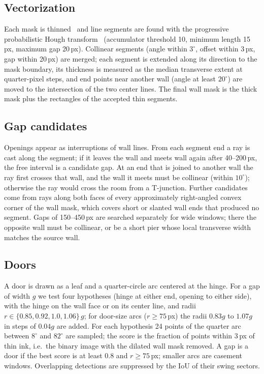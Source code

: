 \documentclass[conference]{IEEEtran}
\begin{document}
\subsection{Vectorization}

Each mask is thinned~\cite{zhang1984thinning} and line segments are found
with the progressive probabilistic Hough transform~\cite{matas2000pphough}
(accumulator threshold 10, minimum length 15\,px, maximum gap 20\,px).
Collinear segments (angle within $3^\circ$, offset within 3\,px, gap within
20\,px) are merged; each segment is extended along its direction to the mask
boundary, its thickness is measured as the median transverse extent at
quarter-pixel steps, and end points near another wall (angle at least
$20^\circ$) are moved to the intersection of the two center lines. The final
wall mask is the thick mask plus the rectangles of the accepted thin
segments.

\subsection{Gap candidates}

Openings appear as interruptions of wall lines. From each segment end a ray
is cast along the segment; if it leaves the wall and meets wall again after
40--200\,px, the free interval is a candidate gap. At an end that is joined
to another wall the ray first crosses that wall, and the wall it meets must
be collinear (within $10^\circ$); otherwise the ray would cross the room
from a T-junction. Further candidates come from rays along both faces of
every approximately right-angled convex corner of the wall mask, which
covers short or slanted wall ends that produced no segment. Gaps of
150--450\,px are searched separately for wide windows; there the opposite
wall must be collinear, or be a short pier whose local transverse width
matches the source wall.

\subsection{Doors}

A door is drawn as a leaf and a quarter-circle arc centered at the hinge.
For a gap of width $g$ we test four hypotheses (hinge at either end, opening
to either side), with the hinge on the wall face or on its center line, and
radii $r \in \{0.85, 0.92, 1.0, 1.06\}\,g$; for door-size arcs
($r \geq 75$\,px) the radii $0.83g$ to $1.07g$ in steps of $0.04g$ are added.
For each hypothesis 24 points of the
quarter arc between $8^\circ$ and $82^\circ$ are sampled; the score is the
fraction of points within 3\,px of thin ink, i.e.\ the binary image with
the dilated wall mask removed. A gap is a door if the best score is at least
0.8 and $r \geq 75$\,px; smaller arcs are casement windows. Overlapping
detections are suppressed by the IoU of their swing sectors.
\end{document}
